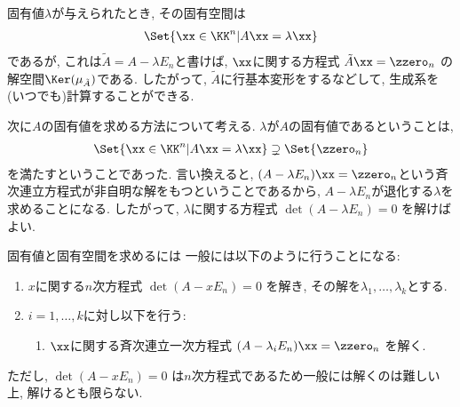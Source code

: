 固有値$\lambda$が与えられたとき,
その固有空間は
\begin{align*}
  \Set{\xx\in \KK^n|A\xx=\lambda\xx}
\end{align*}
であるが, これは$\tilde A=A-\lambda E_n$と書けば,
$\xx$に関する方程式
$\tilde A \xx=\zzero_n$
の解空間$\Ker(\mu_{\tilde A})$である.
したがって, $\tilde A$に行基本変形をするなどして,
生成系を(いつでも)計算することができる.

次に$A$の固有値を求める方法について考える.
$\lambda$が$A$の固有値であるということは,
\begin{align*}
  \Set{\xx\in \KK^n|A\xx=\lambda\xx}\supsetneq \Set{\zzero_n}
\end{align*}
を満たすということであった.
言い換えると,
$(A-\lambda E_n)\xx=\zzero_n$という斉次連立方程式が非自明な解をもつということであるから,
$A-\lambda E_n$が退化する$\lambda$を求めることになる.
したがって,
$\lambda$に関する方程式
$\det(A-\lambda E_n)=0$
を解けばよい.

固有値と固有空間を求めるには
一般には以下のように行うことになる:
\begin{enumerate}
\item
  $x$に関する$n$次方程式
  $\det(A-x E_n)=0$
  を解き,
  その解を$\lambda_1,\ldots,\lambda_k$とする.
\item $i=1,\ldots,k$に対し以下を行う:
  \begin{enumerate}
  \item
    $\xx$に関する斉次連立一次方程式
    $(A-\lambda_i E_n)\xx=\zzero_n$
    を解く.
  \end{enumerate}
\end{enumerate}
ただし,
$\det(A-x E_n)=0$
は$n$次方程式であるため一般には解くのは難しい上, 解けるとも限らない.



